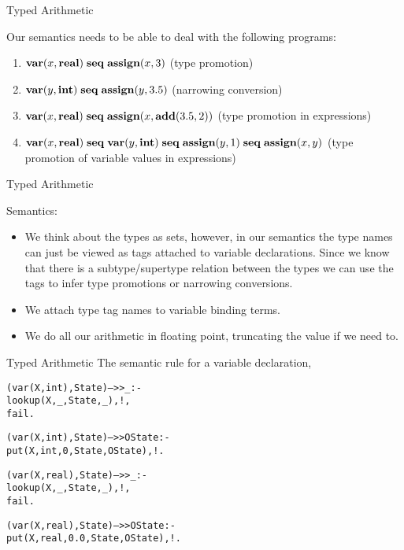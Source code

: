 \documentclass{beamer}
\begin{document}
\begin{frame}[fragile]{Typed Arithmetic}

\small
Our semantics needs to be able to deal with the following programs:
\begin{enumerate}
\item ${\bf var}(x,{\bf real}) \;{ \bf seq }\; {\bf assign}(x, 3)$ (type promotion)
\item ${\bf var}(y,{\bf int}) \;{ \bf seq }\; {\bf assign}(y, 3.5)$ (narrowing conversion)
\item ${\bf var}(x,{\bf real})\; { \bf seq } \;{\bf assign}(x, {\bf add}(3.5,2))$ (type promotion in expressions)
\item ${\bf var}(x,{\bf real})\; { \bf seq }\; {\bf var}(y,{\bf int})\; { \bf seq }  \;{\bf assign}(y, 1)\; { \bf seq }  \;{\bf assign}(x, y)$ (type promotion of
variable values in expressions)
\end{enumerate}


\end{frame}

\begin{frame}[fragile]{Typed Arithmetic}

\small
Semantics:
\begin{itemize}
\item We think about the types as sets, however, in our semantics the type names can just be viewed as tags attached
to variable declarations.  Since we know that there is a subtype/supertype relation between the types we can use
the tags to infer type promotions or narrowing conversions.

\item We attach type tag names to variable binding terms.

\item We do all our arithmetic in
floating point, truncating the value if we need to.
\end{itemize}

\end{frame}

\begin{frame}[fragile]{Typed Arithmetic}
The semantic rule for a variable declaration,
{\tiny
\begin{alltt}
(var(X,int),State) -->> _ :-                % var %decl%
    lookup(X,_,State,_),!,
     fail.

(var(X,int),State) -->> OState :-       % var %decl%
    put(X,int,{\color{red}0},State,OState),!.

(var(X,real),State) -->> _ :-           % var %decl%
    lookup(X,_,State,_),!,
    fail.

(var(X,real),State) -->> OState :-      % var %decl%
    put(X,real,{\color{red}0.0},State,OState),!.

\end{alltt}
}
\end{frame}
\end{document}

